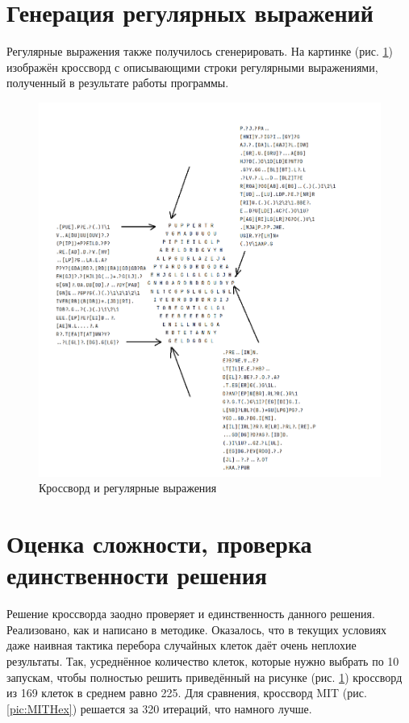 \documentclass[12pt]{report}
\begin{document}
\section{Генерация регулярных выражений} Регулярные выражения также получилось сгенерировать. На картинке (рис. \ref{pic:CrossWithRegexps}) изображён кроссворд с описывающими строки регулярными выражениями, полученный в результате работы программы.
\begin{figure}[p!]
 \centering
    \includegraphics[scale=0.8]{generated9.png}
    \caption{\label{pic:CrossWithRegexps} Кроссворд и регулярные выражения}
\end{figure}

\section{Оценка сложности, проверка единственности решения} Решение кроссворда заодно проверяет и единственность данного решения. Реализовано, как и написано в методике. Оказалось, что в текущих условиях даже наивная тактика перебора случайных клеток даёт очень неплохие результаты. Так, усреднённое количество клеток, которые нужно выбрать по 10 запускам, чтобы полностью решить приведённый на рисунке (рис. \ref{pic:CrossWithRegexps}) кроссворд из 169 клеток в среднем равно 225. Для сравнения, кроссворд MIT (рис. \ref{pic:MITHex}) решается за 320 итераций, что намного лучше.
\end{document}
